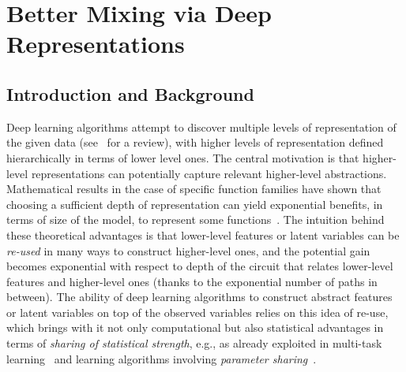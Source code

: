 \vspace*{-1mm}
\fi

\chapter{Better Mixing via Deep Representations \label{chap:mixing}}

\section{Introduction and Background}

Deep learning algorithms attempt to discover multiple levels of
representation of the given data (see~\citep{Bengio-2009} for a review),
with higher levels of representation defined hierarchically in terms of
lower level ones. The central motivation is that higher-level
representations can potentially capture relevant higher-level abstractions.
Mathematical results in the case of
specific function families have shown that choosing a sufficient depth of
representation can yield exponential benefits, in terms of
size of the model, to represent some
functions~\citep{Hastad86,Hastad91,Bengio-localfailure-NIPS-2006,Bengio+Lecun-chapter2007,Bengio+Delalleau-ALT-2011}. The intuition
behind these theoretical advantages is that lower-level features or latent
variables can be {\em re-used} in many ways to construct higher-level ones,
and the potential gain becomes exponential with respect to depth of the
circuit that relates lower-level features and higher-level ones (thanks to
the exponential number of paths in between). The ability of deep learning
algorithms to construct abstract features or latent variables on top of the
observed variables relies on this idea of re-use, which
brings with it not only computational but also statistical advantages in
terms of {\em sharing of statistical strength}, e.g., as already exploited in 
multi-task learning~\citep{caruana95,baxter97,CollobertR2008} and
learning algorithms involving {\em parameter
  sharing}~\citep{Lang+Hinton88,LeCun89a}.

